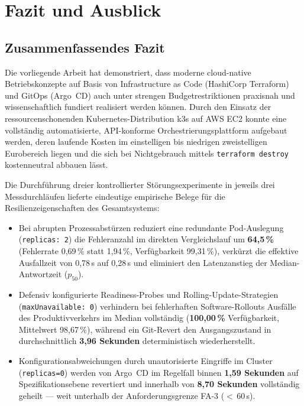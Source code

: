 \chapter{Fazit und Ausblick}
\label{chap:fazit-ausblick}

\section{Zusammenfassendes Fazit}
\label{sec:fazit}
Die vorliegende Arbeit hat demonstriert, dass moderne cloud-native Betriebskonzepte auf Basis von Infrastructure as Code (HashiCorp Terraform) und GitOps (Argo~CD) auch unter strengen Budgetrestriktionen praxisnah und wissenschaftlich fundiert realisiert werden können. Durch den Einsatz der ressourcenschonenden Kubernetes-Distribution k3s auf AWS EC2 konnte eine vollständig automatisierte, API-konforme Orchestrierungsplattform aufgebaut werden, deren laufende Kosten im einstelligen bis niedrigen zweistelligen Eurobereich liegen und die sich bei Nichtgebrauch mittels \texttt{terraform destroy} kostenneutral abbauen lässt.

Die Durchführung dreier kontrollierter Störungsexperimente in jeweils drei Messdurchläufen lieferte eindeutige empirische Belege für die Resilienzeigenschaften des Gesamtsystems:
\begin{itemize}[noitemsep,topsep=2pt]
    \item Bei abrupten Prozessabstürzen reduziert eine redundante Pod-Auslegung (\texttt{replicas: 2}) die Fehleranzahl im direkten Vergleichslauf um \textbf{64,5\,\%} (Fehlerrate 0{,}69\,\% statt 1{,}94\,\%, Verfügbarkeit 99{,}31\,\%), verkürzt die effektive Ausfallzeit von 0{,}78\,s auf 0{,}28\,s und eliminiert den Latenzanstieg der Median-Antwortzeit ($p_{50}$).
    \item Defensiv konfigurierte Readiness-Probes und Rolling-Update-Strategien (\texttt{maxUnavailable: 0}) verhindern bei fehlerhaften Software-Rollouts Ausfälle des Produktivverkehrs im Median vollständig (\textbf{100,00\,\%} Verfügbarkeit, Mittelwert 98{,}67\,\%), während ein Git-Revert den Ausgangszustand in durchschnittlich \textbf{3,96 Sekunden} deterministisch wiederherstellt.
    \item Konfigurationsabweichungen durch unautorisierte Eingriffe im Cluster (\texttt{replicas=0}) werden von Argo~CD im Regelfall binnen \textbf{1,59 Sekunden} auf Spezifikationsebene revertiert und innerhalb von \textbf{8,70 Sekunden} vollständig geheilt — weit unterhalb der Anforderungsgrenze FA-3 ($<$\,60\,s).
\end{itemize}

